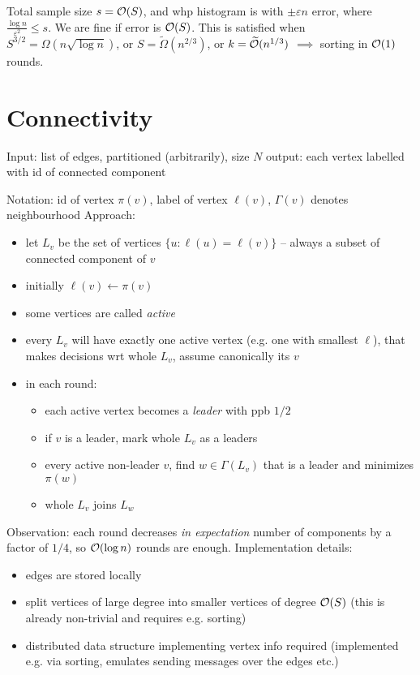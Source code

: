 \documentclass[11pt]{article}
\begin{document}
Total sample size $s = \mathcal{O}(S)$, and whp histogram is with $\pm \varepsilon n$ error, where $\frac{\log n}{\varepsilon^2} \le s$. We are fine if error is $\mathcal{O}(S)$. This is satisfied when $S^{3/2} = \Omega(n \sqrt{\log n})$, or $S = \widetilde\Omega(n^{2/3})$, or $k = \widetilde{\mathcal{O}}(n^{1/3})$ $\implies$ sorting in $\mathcal{O}(1)$ rounds.


\section{Connectivity}
Input: list of edges, partitioned (arbitrarily), size $N$
output: each vertex labelled with id of connected component

Notation: id of vertex $\pi(v)$, label of vertex $\ell(v)$, $\Gamma(v)$ denotes neighbourhood
Approach:
\begin{itemize}
\item let $L_v$ be the set of vertices $\{u : \ell(u) = \ell(v)\}$ -- always a subset of connected component of $v$
\item initially $\ell(v) \gets \pi(v)$
\item some vertices are called \emph{active}
\item every $L_v$ will have exactly one active vertex (e.g. one with smallest $\ell$), that makes decisions wrt whole $L_v$, assume canonically its $v$
\item in each round:
\begin{itemize}
\item each active vertex becomes a \emph{leader} with ppb $1/2$
\item if $v$ is a leader, mark whole $L_v$ as a leaders
\item every active non-leader $v$, find $w \in \Gamma(L_v)$ that is a leader and minimizes $\pi(w)$
\item whole $L_v$ joins $L_w$
\end{itemize}
\end{itemize}

Observation: each round decreases \emph{in expectation} number of components by a factor of $1/4$, so $\mathcal{O}(\log n)$ rounds are enough. Implementation details:
\begin{itemize}
\item edges are stored locally
\item split vertices of large degree into smaller vertices of degree $\mathcal{O}(S)$ (this is already non-trivial and requires e.g. sorting)
\item distributed data structure implementing vertex info required (implemented e.g. via sorting, emulates sending messages over the edges etc.)
\end{itemize}
\end{document}
